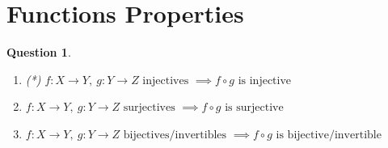 \documentclass[]{article}
\newtheorem{question}{Question}
\begin{document}
\section{Functions Properties}
\begin{question}
	\begin{enumerate}[label=\alph*.]
		\item (*) $f: X \to Y, \ g: Y \to Z \text{ injectives } \implies f \circ g \text{ is injective}$\\
		\item $f: X \to Y, \ g: Y \to Z \text{ surjectives } \implies f \circ g \text{ is surjective}$\\
		\item $f: X \to Y, \ g: Y \to Z \text{ bijectives/invertibles } \implies f \circ g \text{ is bijective/invertible}$
	\end{enumerate}
\end{question}
\end{document}
